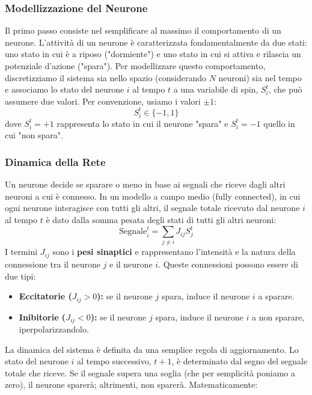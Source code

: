 \subsubsection{Modellizzazione del Neurone}
Il primo passo consiste nel semplificare al massimo il comportamento di un neurone. L'attività di un neurone è caratterizzata fondamentalmente da due stati: uno stato in cui è a riposo ("dormiente") e uno stato in cui si attiva e rilascia un potenziale d'azione ("spara"). Per modellizzare questo comportamento, discretizziamo il sistema sia nello spazio (considerando $N$ neuroni) sia nel tempo e associamo lo stato del neurone $i$ al tempo $t$ a una variabile di spin, $S_i^t$, che può assumere due valori. Per convenzione, usiamo i valori $\pm 1$:
\begin{equation}
S_i^t \in \{-1, 1\}
\end{equation}
dove $S_i^t = +1$ rappresenta lo stato in cui il neurone "spara" e $S_i^t = -1$ quello in cui "non spara".

\subsubsection{Dinamica della Rete}
Un neurone decide se sparare o meno in base ai segnali che riceve dagli altri neuroni a cui è connesso. In un modello a campo medio (fully connected), in cui ogni neurone interagisce con tutti gli altri, il segnale totale ricevuto dal neurone $i$ al tempo $t$ è dato dalla somma pesata degli stati di tutti gli altri neuroni:
\begin{equation}
\text{Segnale}_i^t = \sum_{j \neq i} J_{ij} S_j^t
\end{equation}
I termini $J_{ij}$ sono i \textbf{pesi sinaptici} e rappresentano l'intensità e la natura della connessione tra il neurone $j$ e il neurone $i$. Queste connessioni possono essere di due tipi:
\begin{itemize}
\item \textbf{Eccitatorie ($J_{ij} > 0$):} se il neurone $j$ spara, induce il neurone $i$ a sparare.
\item \textbf{Inibitorie ($J_{ij} < 0$):} se il neurone $j$ spara, induce il neurone $i$ a non sparare, iperpolarizzandolo.
\end{itemize}
La dinamica del sistema è definita da una semplice regola di aggiornamento. Lo stato del neurone $i$ al tempo successivo, $t+1$, è determinato dal segno del segnale totale che riceve. Se il segnale supera una soglia (che per semplicità poniamo a zero), il neurone sparerà; altrimenti, non sparerà. Matematicamente:


